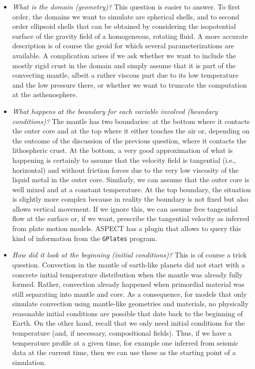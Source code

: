 \documentclass{article}
\newcommand{\aspect}{\textsc{ASPECT}}
\begin{document}
\begin{itemize}
  \item \textit{What is the domain (geometry)?}
    This question is easier to answer. To first order, the domains we want to
    simulate are spherical shells, and to second order ellipsoid shells that can
    be obtained by considering the isopotential surface of the gravity field of
    a homogeneous, rotating fluid.
    A more accurate description is of course the geoid for which several
    parameterizations are available. A complication arises if we ask whether we
    want to include the mostly rigid crust in the domain and simply assume that
    it is part of the convecting mantle, albeit a rather viscous part due to its
    low temperature and the low pressure there, or whether we want to truncate
    the computation at the asthenosphere.

  \item \textit{What happens at the boundary for each variable involved
      (boundary conditions)?}
    The mantle has two boundaries: at the bottom where it contacts the outer core
    and at the top where it either touches the air or, depending on the outcome
    of the discussion of the previous question, where it contacts the
    lithospheric crust. At the bottom, a very good approximation of what is
    happening is certainly to assume that the velocity field is tangential
    (i.e., horizontal) and without friction forces due to the very low viscosity
    of the liquid metal in the outer core. Similarly, we can assume that the
    outer core is well mixed and at a constant temperature. At the top boundary,
    the situation is slightly more complex because in reality the boundary is not
    fixed but also allows vertical movement. If we ignore this, we can assume
    free tangential flow at the surface or, if we want, prescribe the tangential
    velocity as inferred from plate motion models. \aspect{} has a plugin that
    allows to query this kind of information from the \texttt{GPlates} program.

  \item \textit{How did it look at the beginning (initial conditions)?}
    This is of course a trick question. Convection in the mantle of earth-like
    planets did not start with a concrete initial temperature distribution when
    the mantle was already fully formed. Rather, convection already happened
    when primordial material was still separating into mantle and core. As a
    consequence, for models that only simulate convection using mantle-like
    geometries and materials, no physically reasonable initial conditions are
    possible that date back to the beginning of Earth. On the other hand, recall
    that we only need initial conditions for the temperature (and, if
    necessary, compositional fields). Thus, if we have a temperature profile at
    a given time, for example one inferred from seismic data at the current
    time, then we can use these as the starting point of a simulation.
\end{itemize}
\end{document}
